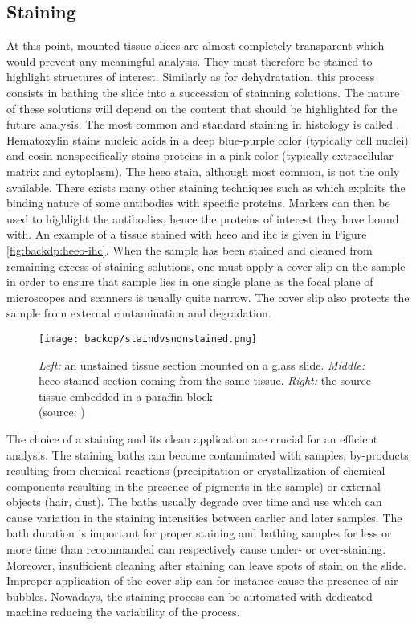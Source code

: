 \subsection{Staining}
\label{ssec:backdp:staining}
At this point, mounted tissue slices are almost completely transparent which would prevent any meaningful analysis. They must therefore be stained to highlight structures of interest. Similarly as for dehydratation, this process consists in bathing the slide into a succession of stainning solutions. The nature of these solutions will depend on the content that should be highlighted for the future analysis. The most common and standard staining in histology is called . Hematoxylin stains nucleic acids in a deep blue-purple color (typically cell nuclei) and eosin nonspecifically stains proteins in a pink color (typically extracellular matrix and cytoplasm). The \acrshort{heeo} stain, although most common, is not the only available. There exists many other staining techniques such as  which exploits the binding nature of some antibodies with specific proteins. Markers can then be used to highlight the antibodies, hence the proteins of interest they have bound with. An example of a tissue stained with \acrshort{heeo} and \acrshort{ihc} is given in Figure \ref{fig:backdp:heeo-ihc}. When the sample has been stained and cleaned from remaining excess of staining solutions, one must apply a cover slip on the sample in order to ensure that sample lies in one single plane as the focal plane of microscopes and scanners is usually quite narrow. The cover slip also protects the sample from external contamination and degradation. 

\begin{figure}
  \centering
  \texttt{[image: backdp/staindvsnonstained.png]}
  \caption{\textit{Left:} an unstained tissue section mounted on a glass slide. \textit{Middle:} \acrshort{heeo}-stained section coming from the same tissue. \textit{Right:} the source tissue embedded in a paraffin block \\ (source: \parencite{abbasi2019all})}
  \label{fig:backdp:stainedvsnonstained}
\end{figure}

The choice of a staining and its clean application are crucial for an efficient analysis. The staining baths can become contaminated with samples, by-products resulting from chemical reactions (\eg precipitation or crystallization of chemical components resulting in the presence of pigments in the sample) or external objects (\eg hair, dust). The baths usually degrade over time and use which can cause variation in the staining intensities between earlier and later samples. The bath duration is important for proper staining and bathing samples for less or more time than recommanded can respectively cause under- or over-staining. Moreover, insufficient cleaning after staining can leave spots of stain on the slide. Improper application of the cover slip can for instance cause the presence of air bubbles. Nowadays, the staining process can be automated with dedicated machine reducing the variability of the process. 

